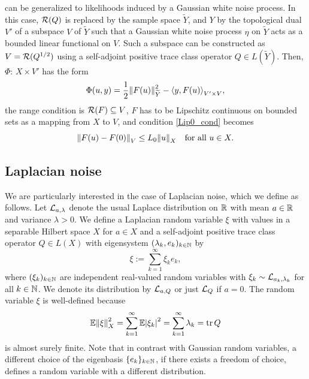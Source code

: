 \documentclass[english]{jnsao}
\theoremstyle{definition}
\begin{document}
\begin{remark}
	 can be generalized to likelihoods induced by a Gaussian white noise process. In this case, $\operatorname{\mathcal{R}}(Q)$ is replaced by the sample space $\widetilde{Y}$, and $Y$ by the topological dual $V'$ of a subspace $V$ of $\widetilde{Y}$ such that a Gaussian white noise process $\eta$ on $\widetilde{Y}$ acts as a bounded linear functional on $V$. Such a subspace can be constructed as $V = \operatorname{\mathcal{R}}(Q^{1/2})$ using a self-adjoint positive trace class operator $Q \in L(\widetilde{Y})$. Then, $\Phi$: $X \times V'$ has the form
	\[ \Phi(u,y) = \frac12{\lVert F(u)\rVert}_{\widetilde{Y}}^2 - {\langle y,F(u)\rangle}_{V' \times V}, \]
	the range condition is $\operatorname{\mathcal{R}}(F) \subseteq V$, $F$ has to be Lipschitz continuous on bounded sets as a mapping from $X$ to $V$, and condition \eqref{Lip0_cond} becomes
	\[ {\lVert F(u) - F(0)\rVert}_{V} \le L_0{\lVert u\rVert}_X \quad \text{for all}~u \in X. \]
\end{remark}

\subsection{Laplacian noise}
\label{sec:laplacian_noise}

We are particularly interested in the case of Laplacian noise, which we define as follows.
Let $\mathcal{L}_{a,\lambda}$ denote the usual Laplace distribution on ${\mathbb{R}}$ with mean $a \in {\mathbb{R}}$ and variance $\lambda > 0$.
We define a Laplacian random variable $\xi$ with values in a separable Hilbert space $X$ for $a \in X$ and a self-adjoint positive trace class operator $Q \in L(X)$ with eigensystem $(\lambda_k,e_k)_{k\in\mathbb{N}}$ by
\[
	\xi := \sum_{k=1}^\infty \xi_k e_k,
\]
where $(\xi_k)_{k\in\mathbb{N}}$ are independent real-valued random variables with $\xi_k \sim \mathcal{L}_{a_k,\lambda_k}$ for all $k\in\mathbb{N}$. We denote its distribution by $\mathcal{L}_{a,Q}$ or just $\mathcal{L}_Q$ if $a = 0$. 
The random variable $\xi$ is well-defined because
\[ \mathbb{E}{\lVert\xi\rVert}_X^2 = \sum_{k=1}^\infty \mathbb{E}{\lvert\xi_k\rvert}^2 = \sum_{k=1}^\infty \lambda_k = \operatorname{tr} Q \]
is almost surely finite.
Note that in contrast with Gaussian random variables, a different choice of the eigenbasis $\{e_k\}_{k\in\mathbb{N}}$, if there exists a freedom of choice, defines a random variable with a different distribution.
\end{document}
